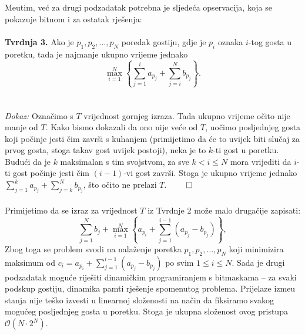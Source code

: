Me\dj utim, već za drugi podzadatak potrebna je sljedeća opservacija, koja se pokazuje bitnom i za ostatak rješenja:
\\\\
\textbf{Tvrdnja 3.} Ako je $p_1, p_2, \ldots, p_N$ poredak gostiju, gdje je $p_i$ oznaka $i$-tog gosta u poretku, tada je najmanje ukupno vrijeme jednako $$\max_{i = 1}^{N} \left\{ \sum_{j=1}^{i} a_{p_j} + \sum_{j=i}^{N} b_{p_j}\right\}.$$
\\\\
\textit{Dokaz:} Označimo s $T$ vrijednost gornjeg izraza. Tada ukupno vrijeme očito nije manje od $T$. Kako bismo dokazali da ono nije veće od $T$, uočimo posljednjeg gosta koji počinje jesti čim završi s kuhanjem (primijetimo da će to uvijek biti slučaj za prvog gosta, stoga takav gost uvijek postoji), neka je to $k$-ti gost u poretku. Budući da je $k$ maksimalan s tim svojstvom, za sve $k < i \leq N$ mora vrijediti da $i$-ti gost počinje jesti čim $(i-1)$-vi gost završi. Stoga je ukupno vrijeme jednako $\sum_{j=1}^{k} a_{p_j} + \sum_{j=k}^{N} b_{p_j}$, što očito ne prelazi $T$. $\qed$
\\\\
Primijetimo da se izraz za vrijednost $T$ iz Tvrdnje 2 može malo drugačije zapisati: $$\sum_{j=1}^{N} b_j + \max_{i = 1}^{N} \left\{a_{p_i} + \sum_{j=1}^{i-1} (a_{p_j} - b_{p_j})\right\},$$ Zbog toga se problem svodi na nalaženje poretka $p_1, p_2, \ldots, p_N$ koji minimizira maksimum od $c_i = a_{p_i} + \sum_{j=1}^{i-1} (a_{p_j} - b_{p_j})$ po svim $1 \leq i \leq N$. Sada je drugi podzadatak moguće riješiti dinamičkim programiranjem s bitmaskama -- za svaki podskup gostiju, dinamika pamti rješenje spomenutog problema. Prijelaze izme\dj u stanja nije teško izvesti u linearnoj složenosti na način da fiksiramo svakog mogućeg posljednjeg gosta u poretku. Stoga je ukupna složenost ovog pristupa $\mathcal{O}(N \cdot 2^N)$.

